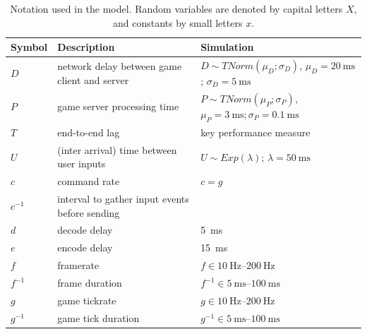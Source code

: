 \begin{table}[!t]
\caption{Notation used in the model. Random variables are denoted by capital letters $X$, and constants by small letters $x$.}
\label{tab:notation}
	\centering
	\begin{tabu}{lX[1,l]X[1,l]}
	\toprule
	\textbf{Symbol} & \textbf{Description} & \textbf{Simulation} \\
	\midrule
	$D$ & network delay between game client and server & $D \sim TNorm(\mu_D;\sigma_D)$, $\mu_D = \SI{20}{\milli\second}$; $\sigma_D = \SI{5}{\milli\second}$\\
	$P$ & game server processing time & $P \sim TNorm(\mu_P;\sigma_P)$, $ \mu_P = \SI{3}{\milli\second}; \sigma_P = \SI{0.1}{\milli\second}$\\
	$T$ & end-to-end lag & key performance measure \\
	$U$ & (inter arrival) time between user inputs & $U \sim Exp(\lambda)$; $\lambda = \SI{50}{\milli\second}$\\
	\midrule
	$c$ & command rate & $c=g$ \\
	$c^{-1}$ & interval to gather input events before sending & \\
	$d$ & decode delay & \SI{5}{\milli\second} \\
	$e$ & encode delay & \SI{15}{\milli\second} \\
	$f$ & framerate & $f \in \SIrange{10}{200}{\hertz}$ \\
	$f^{-1}$ & frame duration & $f^{-1} \in \SIrange{5}{100}{\milli\second}$ \\
	$g$ & game tickrate & $g \in \SIrange{10}{200}{\hertz}$ \\
	$g^{-1}$ & game tick duration & $g^{-1} \in \SIrange{5}{100}{\milli\second}$ \\
	\bottomrule
	\end{tabu}
\end{table}


